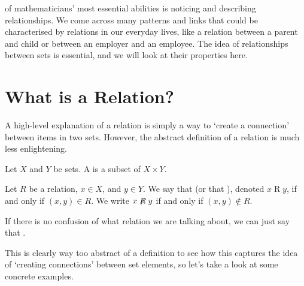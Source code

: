  of mathematicians' most essential abilities is noticing and describing relationships. We come across many patterns and links that could be characterised by relations in our everyday lives, like a relation between a parent and child or between an employer and an employee. The idea of relationships between sets is essential, and we will look at their properties here.

\section{What is a Relation?}
A high-level explanation of a relation is simply a way to `create a connection' between items in two sets. However, the abstract definition of a relation is much less enlightening.

\begin{definition}[Relation]
    Let $X$ and $Y$ be sets. A  is a subset of $X \times Y$.

    Let $R$ be a relation, $x \in X$, and $y \in Y$. We say that  (or that ), denoted $x\mathrel{R}y$, if and only if $(x, y) \in R$. We write $x\not\mathrel{R}y$ if and only if $(x, y) \notin R$.

    If there is no confusion of what relation we are talking about, we can just say that .
\end{definition}

This is clearly way too abstract of a definition to see how this captures the idea of `creating connections' between set elements, so let's take a look at some concrete examples.

